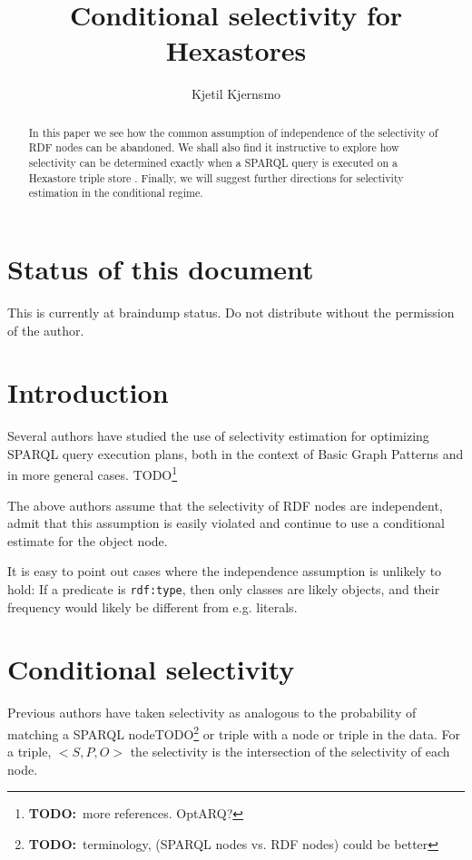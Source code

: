 \documentclass[12pt, draft]{article}
\title{Conditional selectivity for Hexastores}
\author{Kjetil Kjernsmo}
\newcommand{\rdfnode}[1]{\texttt{#1}}
\newcommand{\todo}[1]{\tiny{TODO}\normalsize\footnote{\textbf{TODO:}~#1}}
\begin{document}
\maketitle

\section*{Status of this document}

This is currently at braindump status. Do not distribute without the
permission of the author.

\begin{abstract}
In this paper we see how the common assumption of independence of the
selectivity of RDF nodes can be abandoned. We shall also find it
instructive to explore how selectivity can be determined exactly when
a SPARQL query is executed on a Hexastore triple store
\cite{Weiss:2008:HSI:1453856.1453965}. Finally, we will suggest
further directions for selectivity estimation in the conditional
regime.

\end{abstract}

\section{Introduction}

Several authors have studied the use of selectivity estimation for
optimizing SPARQL query execution plans, both in the context of Basic
Graph Patterns \cite{Stocker:2008:SBG:1367497.1367578} and in more
general cases. \todo{more references. OptARQ?}

The above authors assume that the selectivity of RDF nodes are
independent, admit that this assumption is easily violated and
continue to use a conditional estimate for the object node.

It is easy to point out cases where the independence assumption is
unlikely to hold: If a predicate is \rdfnode{rdf:type}, then only
classes are likely objects, and their frequency  would likely be
different from e.g. literals.

\section{Conditional selectivity}

Previous authors have taken selectivity as analogous to the
probability of matching a SPARQL node\todo{terminology, (SPARQL nodes
  vs. RDF nodes) could be better} or triple with a node or triple
in the data. For a triple, $<S, P, O>$ the selectivity is the
intersection of the selectivity of each node.
\end{document}
